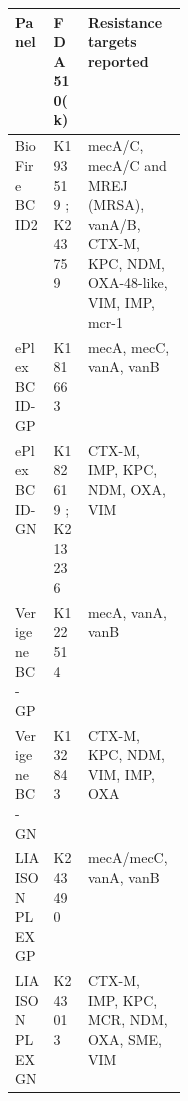 \begin{tabularx}{\linewidth}{@{}l>{\raggedright\arraybackslash}p{0.2\linewidth}>{\raggedright\arraybackslash}X@{}}
\toprule
Panel & FDA 510(k) & Resistance targets reported \\
\midrule
BioFire BCID2 & K193519 ; K243759 & mecA/C, mecA/C and MREJ (MRSA), vanA/B, CTX-M, KPC, NDM, OXA-48-like, VIM, IMP, mcr-1 \\
ePlex BCID-GP & K181663 & mecA, mecC, vanA, vanB \\
ePlex BCID-GN & K182619 ; K213236 & CTX-M, IMP, KPC, NDM, OXA, VIM \\
Verigene BC-GP & K122514 & mecA, vanA, vanB \\
Verigene BC-GN & K132843 & CTX-M, KPC, NDM, VIM, IMP, OXA \\
LIAISON PLEX GP & K243490 & mecA/mecC, vanA, vanB \\
LIAISON PLEX GN & K243013 & CTX-M, IMP, KPC, MCR, NDM, OXA, SME, VIM \\
\bottomrule
\end{tabularx}
